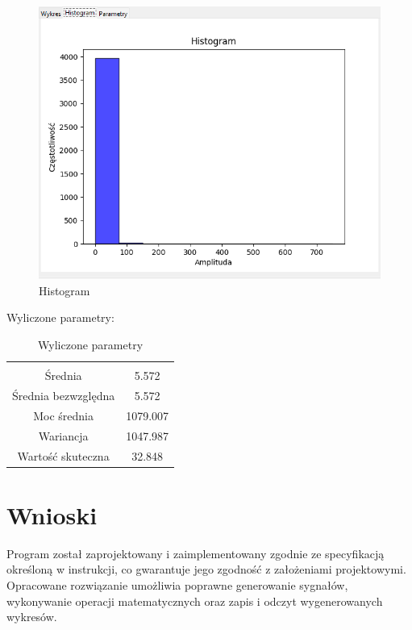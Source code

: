 \documentclass{article}
\begin{document}
\begin{figure}[h!]
    \centering
    \includegraphics[width=\textwidth]{img/div/hist.png}
    \caption{Histogram}
\end{figure}
\FloatBarrier
Wyliczone parametry:
\begin{table}[h!]
    \centering
    \vspace{0.2cm}
    \begin{tabular}{|c|c|}
        \hline\hline\\[-0.4cm]
        Średnia & 5.572 \\
        \hline
        Średnia bezwzględna & 5.572  \\
        \hline
        Moc średnia & 1079.007  \\
        \hline
        Wariancja & 1047.987 \\
        \hline
        Wartość skuteczna & 32.848 \\
        \hline
    \end{tabular}
    \caption{Wyliczone parametry}
    \label{div}
\end{table}   

\section{Wnioski}
    Program został zaprojektowany i zaimplementowany zgodnie ze specyfikacją
    określoną w instrukcji, co gwarantuje jego zgodność z założeniami projektowymi. 
    Opracowane rozwiązanie umożliwia poprawne generowanie sygnałów, wykonywanie operacji 
    matematycznych oraz zapis i odczyt wygenerowanych wykresów.
\end{document}
